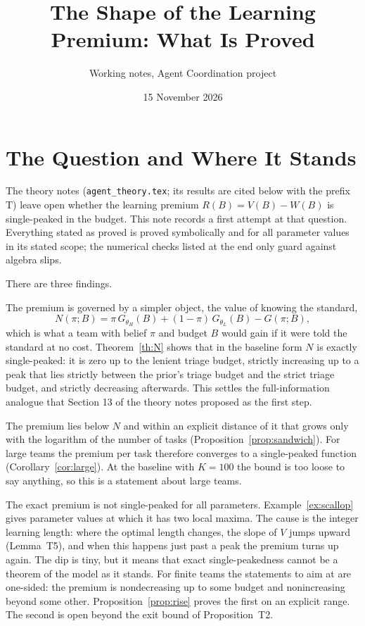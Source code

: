 \documentclass[11pt]{article}
\title{The Shape of the Learning Premium: What Is Proved}
\author{Working notes, Agent Coordination project}
\date{15 November 2026}
\theoremstyle{definition}
\begin{document}
\maketitle

\section{The Question and Where It Stands}

The theory notes (\texttt{agent\_theory.tex}; its results are cited below with the prefix T) leave open whether the learning premium $R(B)=V(B)-W(B)$ is single-peaked in the budget. This note records a first attempt at that question. Everything stated as proved is proved symbolically and for all parameter values in its stated scope; the numerical checks listed at the end only guard against algebra slips.

There are three findings.

The premium is governed by a simpler object, the value of knowing the standard,
\[
N(\pi;B)=\pi\,G_{\theta_H}(B)+(1-\pi)\,G_{\theta_L}(B)-G(\pi;B),
\]
which is what a team with belief $\pi$ and budget $B$ would gain if it were told the standard at no cost. Theorem~\ref{th:N} shows that in the baseline form $N$ is exactly single-peaked: it is zero up to the lenient triage budget, strictly increasing up to a peak that lies strictly between the prior's triage budget and the strict triage budget, and strictly decreasing afterwards. This settles the full-information analogue that Section 13 of the theory notes proposed as the first step.

The premium lies below $N$ and within an explicit distance of it that grows only with the logarithm of the number of tasks (Proposition~\ref{prop:sandwich}). For large teams the premium per task therefore converges to a single-peaked function (Corollary~\ref{cor:large}). At the baseline with $K=100$ the bound is too loose to say anything, so this is a statement about large teams.

The exact premium is not single-peaked for all parameters. Example~\ref{ex:scallop} gives parameter values at which it has two local maxima. The cause is the integer learning length: where the optimal length changes, the slope of $V$ jumps upward (Lemma~T5), and when this happens just past a peak the premium turns up again. The dip is tiny, but it means that exact single-peakedness cannot be a theorem of the model as it stands. For finite teams the statements to aim at are one-sided: the premium is nondecreasing up to some budget and nonincreasing beyond some other. Proposition~\ref{prop:rise} proves the first on an explicit range. The second is open beyond the exit bound of Proposition~T2.
\end{document}
